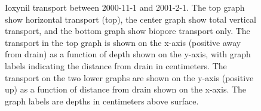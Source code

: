 \begin{figure}[htbp]
  \centering

  \caption{Ioxynil transport between 2000-11-1 and 2001-2-1.  The top
    graph show horizontal transport (top), the center graph show total
    vertical transport, and the bottom graph show biopore transport
    only.  The transport in the top graph is shown on the x-axis
    (positive away from drain) as a function of depth shown on the
    y-axis, with graph labels indicating the distance from drain in
    centimeters.  The transport on the two lower graphs are shown on
    the y-axis (positive up) as a function of distance from drain
    shown on the x-axis. The graph labels are depths in centimeters above
    surface.}
  \label{fig:Rorrende-Ioxynil-2000}
\end{figure}

